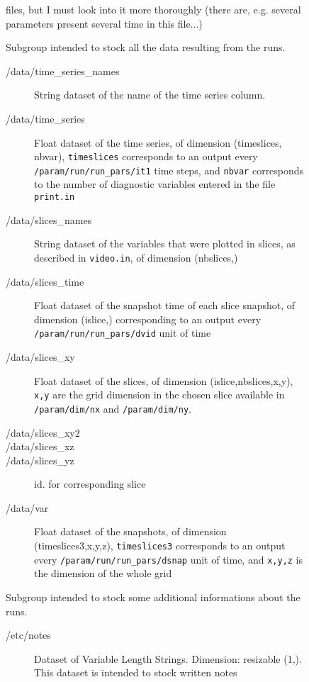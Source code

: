 \documentclass[a4paper,12pt]{article}
\begin{document}
\begin{figure}[p]
{\begin{description}
\begin{description}
\begin{description}
{        files, but I must look into it more thoroughly (there are,
        e.g. several parameters present several time in this file...)}
    \end{description}
  \item[/data/] Subgroup intended to stock all the data resulting from
    the runs.
    \begin{description}
    \item[/data/time\_series\_names] String dataset of the name of the
      time series column.
    \item[/data/time\_series] Float dataset of the time series, of
      dimension (timeslices, nbvar),  \texttt{timeslices} corresponds
      to an output every \texttt{/param/run/run\_pars/it1} time
      steps, and \texttt{nbvar} corresponds to the number of
      diagnostic variables entered in the file \texttt{print.in}
      \item[/data/slices\_names] String dataset of the variables that
        were plotted in slices, as described in \texttt{video.in}, of
        dimension (nbslices,)
      \item[/data/slices\_time] Float dataset of the snapshot time of each
        slice snapshot, of dimension (islice,)  corresponding to an output
        every \texttt{/param/run/run\_pars/dvid} unit of time
      \item[/data/slices\_xy] Float dataset of the slices, of dimension
        (islice,nbslices,x,y),  \texttt{x,y} are the grid dimension in the chosen slice
        available in \texttt{/param/dim/nx} and \texttt{/param/dim/ny}.
      \item[/data/slices\_xy2] 
      \item[/data/slices\_xz]
      \item[/data/slices\_yz] id. for corresponding slice
    \item[/data/var] Float dataset of the snapshots, of dimension
      (timeslices3,x,y,z), \texttt{timeslices3} corresponds to an
      output every  \texttt{/param/run/run\_pars/dsnap} unit of time,
      and \texttt{x,y,z} is the dimension of the whole grid
    \end{description}
  \item[/etc/] Subgroup intended to stock some additional
    informations about the runs.
    \begin{description}
    \item[/etc/notes] Dataset of Variable Length Strings. Dimension:
      resizable (1,). This dataset is intended to stock written notes

\end{description}
\end{description}
\end{description}}
\end{figure}
\end{document}
